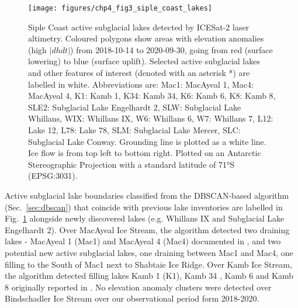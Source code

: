 \begin{figure}[htbp]
  \texttt{[image: figures/chp4\_fig3\_siple\_coast\_lakes]}
  \caption[Siple Coast active subglacial lakes detected by ICESat-2 laser altimetry]{
    Siple Coast active subglacial lakes detected by ICESat-2 laser altimetry.
    Coloured polygons show areas with elevation anomalies (high $|dhdt|$) from 2018-10-14 to 2020-09-30, going from red (surface lowering) to blue (surface uplift).
    Selected active subglacial lakes and other features of interest (denoted with an asterisk *) are labelled in white.
    Abbreviations are: Mac1: MacAyeal 1, Mac4: MacAyeal 4, K1: Kamb 1, K34: Kamb 34, K6: Kamb 6, K8: Kamb 8, SLE2: Subglacial Lake Engelhardt 2, SLW: Subglacial Lake Whillans, WIX: Whillans IX, W6: Whillans 6, W7: Whillans 7, L12: Lake 12, L78: Lake 78, SLM: Subglacial Lake Mercer, SLC: Subglacial Lake Conway.
    Grounding line \citep{DepoorterAntarcticmasksiceshelves2013} is plotted as a white line.
    Ice flow is from top left to bottom right.
    Plotted on an Antarctic Stereographic Projection with a standard latitude of 71°S (EPSG:3031).
  }
  \label{fig:4.3}
\end{figure}

Active subglacial lake boundaries classified from the DBSCAN-based algorithm (Sec.~\ref{sec:dbscan}) that coincide with previous lake inventories \citep{Smithinventoryactivesubglacial2009,SiegfriedThirteenyearssubglacial2018} are labelled in Fig.~\ref{fig:4.3} alongside newly discovered lakes (e.g. Whillans IX and Subglacial Lake Engelhardt 2).
Over MacAyeal Ice Stream, the algorithm detected two draining lakes - MacAyeal 1 (Mac1) and MacAyeal 4 (Mac4) documented in \citet{FrickerSynthesizingmultipleremotesensing2010}, and two potential new active subglacial lakes, one draining between Mac1 and Mac4, one filling to the South of Mac1 next to Shabtaie Ice Ridge.
Over Kamb Ice Stream, the algorithm detected filling lakes Kamb 1 (K1), Kamb 34 \citep[K34, see also][]{KimActivesubglaciallakes2016}, Kamb 6 and Kamb 8 originally reported in \citet{Smithinventoryactivesubglacial2009}.
No elevation anomaly clusters were detected over Bindschadler Ice Stream over our observational period form 2018-2020.

